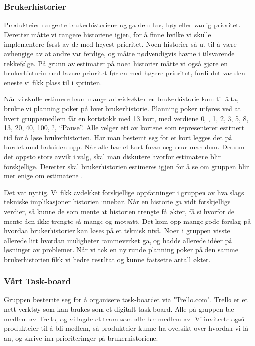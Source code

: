 \documentclass[12pt,a4paper,norsk]{article}
\begin{document}
  \subsubsection{Brukerhistorier}
  Produkteier rangerte brukerhistoriene og ga dem lav, høy eller vanlig prioritet. Deretter måtte vi rangere historiene igjen, for å finne hvilke vi skulle implementere først av de med høyest prioritet. Noen historier så ut til å være avhengige av at andre var ferdige, og måtte nødvendigvis havne i tilsvarende rekkefølge. På grunn av estimater på noen historier måtte vi også gjøre en brukerhistorie med lavere prioritet før en med høyere prioritet, fordi det var den eneste vi fikk plass til i sprinten.

    Når vi skulle estimere hvor mange arbeidsøkter en brukerhistorie kom til å ta, brukte vi planning poker på hver brukerhistorie. Planning poker utføres ved at hvert gruppemedlem får en kortstokk med 13 kort, med verdiene 0, , 1, 2, 3, 5, 8, 13, 20, 40, 100, ?, “Pause”. Alle velger ett av kortene som representerer estimert tid for å løse brukerhistorien. Har man bestemt seg for et kort legges det på bordet med baksiden opp. Når alle har et kort foran seg snur man dem. Dersom det oppsto store avvik i valg, skal man diskutere hvorfor estimatene blir forskjellige. Deretter skal brukerhistorien estimeres igjen for å se om gruppen blir mer enige om estimatene \cite[side 38-40]{kniberg}.

    Det var nyttig. Vi fikk avdekket forskjellige oppfatninger i gruppen av hva slags tekniske implikasjoner historien innebar. Når en historie ga vidt forskjellige verdier, så kunne de som mente at historien trengte få økter, få si hvorfor de mente den ikke trengte så mange og motsatt. Det kom opp mange gode forslag på hvordan brukerhistorier kan løses på et teknisk nivå. Noen i gruppen visste allerede litt hvordan muligheter rammeverket ga, og hadde allerede idéer på løsninger av problemer. Når vi tok en ny runde planning poker på den samme brukerhistorien fikk vi bedre resultat og kunne fastsette antall økter.

  \subsubsection{Vårt Task-board}
  Gruppen bestemte seg for å organisere task-boardet via "Trello.com". Trello er et nett-verktøy som kan brukes som et digitalt task-board. Alle på gruppen ble medlem av Trello, og vi lagde et team som alle ble medlem av. Vi inviterte også produkteier til å bli medlem, så produkteier kunne ha oversikt over hvordan vi lå an, og skrive inn prioriteringer på brukerhistoriene.
\end{document}
